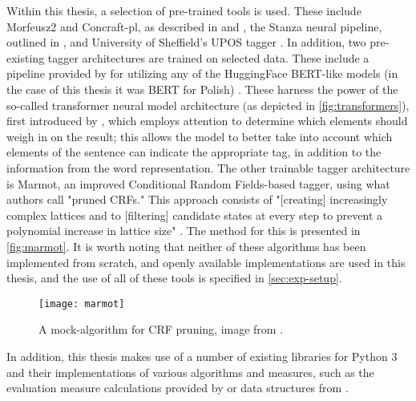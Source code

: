 Within this thesis, a selection of pre-trained tools is used. These include Morfeusz2 and Concraft-pl, as described in \cite{waszczuk-2012-harnessing} and \citet{kie:wol:17:morf}, the Stanza neural pipeline, outlined in \citet{qi2020stanza}, and University of Sheffield's UPOS tagger \citep{gatecloud}. In addition, two pre-existing tagger architectures are trained on selected data. These include a pipeline provided by \citet{wolf-etal-2020-transformers} for utilizing any of the HuggingFace BERT-like models (in the case of this thesis it was BERT for Polish) \citep{kłeczek_2021}. These harness the power of the so-called transformer neural model architecture (as depicted in \autoref{fig:transformers}), first introduced by \citet{vaswani2017attention}, which employs attention to determine which elements should weigh in on the result; this allows the model to better take into account which elements of the sentence can indicate the appropriate tag, in addition to the information from the word representation. The other trainable tagger architecture is Marmot, an improved Conditional Random Fields-based tagger, using what authors call "pruned CRFs." This approach consists of "[creating] increasingly complex lattices and to [filtering] candidate states at every step to prevent a polynomial increase in lattice size" \citep{mueller-etal-2013-efficient}. The method for this is presented in \autoref{fig:marmot}. It is worth noting that neither of these algorithms has been implemented from scratch, and openly available implementations are used in this thesis, and the use of all of these tools is specified in \autoref{sec:exp-setup}. 

\begin{figure}[H]
\centering
\texttt{[image: marmot]}
\caption{\label{fig:marmot} A mock-algorithm for CRF pruning, image from \citet{mueller-etal-2013-efficient}.}
\end{figure}

In addition, this thesis makes use of a number of existing libraries for Python 3 and their implementations of various algorithms and measures, such as the evaluation measure calculations provided by \citet{scikit-learn} or data structures from \citet{reback2020pandas}. 